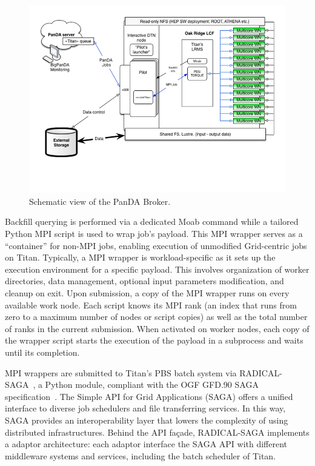 \begin{figure}
  \begin{center}
    \includegraphics[width=\columnwidth]{figures/PanDA_setup_at_OLCF.png}
    \caption{Schematic view of the PanDA Broker.}
  \end{center}
\label{fig:panda_broker}
\end{figure}

Backfill querying is performed via a dedicated Moab command while a tailored
Python MPI script is used to wrap job's payload. This MPI wrapper serves as a
``container'' for non-MPI jobs, enabling execution of unmodified Grid-centric
jobs on Titan. Typically, a MPI wrapper is workload-specific as it sets up the
execution environment for a specific payload. This involves organization of
worker directories, data management, optional input parameters modification, and
cleanup on exit. Upon submission, a copy of the MPI wrapper runs on every
available work node. Each script knows its MPI rank (an index that runs from
zero to a maximum number of nodes or script copies) as well as the total number
of ranks in the current submission. When activated on worker nodes, each copy of
the wrapper script starts the execution of the payload in a subprocess and waits
until its completion.

MPI wrappers are submitted to Titan's PBS batch system via
RADICAL-SAGA~\cite{radical-saga}, a Python module, compliant with the OGF GFD.90
SAGA specification~\cite{saga-spec}. The Simple API for Grid Applications (SAGA)
offers a unified interface to diverse job schedulers and file transferring
services. In this way, SAGA provides an interoperability layer that lowers the
complexity of using distributed infrastructures. Behind the API façade,
RADICAL-SAGA implements a adaptor architecture: each adaptor interface the SAGA
API with different middleware systems and services, including the batch
scheduler of Titan.

